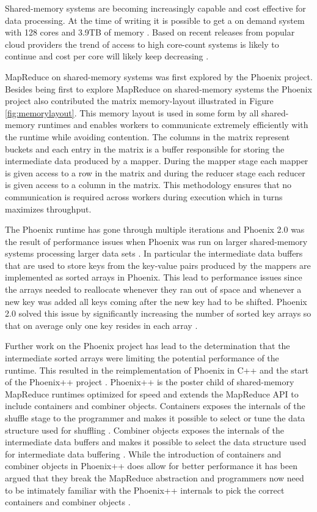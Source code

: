 \documentclass[twocolumn,11px]{article}       %
\begin{document}
Shared-memory systems are becoming increasingly capable and cost effective for
data processing. At the time of writing it is possible to get a on demand system
with 128 cores and 3.9TB of memory \cite{AWS}. Based on
recent releases from popular cloud providers the trend of access to high
core-count systems is likely to continue and cost per core will likely keep
decreasing \cite{AWS} \cite{GoogleCloud}.

MapReduce on shared-memory systems was first explored by the Phoenix
\cite{Phoenix} project. Besides being first to explore MapReduce on
shared-memory systems the Phoenix project also contributed the matrix
memory-layout illustrated in Figure \ref{fig:memorylayout}. This memory layout
is used in some form by all shared-memory runtimes \cite{Phoenix}
\cite{Phoenix++} \cite{CilkMR} \cite{Metis} \cite{Ostrich} and enables workers
to communicate extremely efficiently with the runtime while avoiding contention.
The columns in the matrix represent buckets and each entry in the matrix is a
buffer responsible for storing the intermediate data produced by a mapper.
During the mapper stage each mapper is given access to a row in the matrix and
during the reducer stage each reducer is given access to a column in the matrix.
This methodology ensures that no communication is required across workers during
execution which in turns maximizes throughput.

The Phoenix runtime has gone through multiple iterations and Phoenix 2.0 was the
result of performance issues when Phoenix was run on larger shared-memory
systems processing larger data sets \cite{Phoenix2}. In particular the
intermediate data buffers that are used to store keys from the key-value pairs
produced by the mappers are implemented as sorted arrays in Phoenix. This lead
to performance issues since the arrays needed to reallocate whenever they ran
out of space and whenever a new key was added all keys coming after the new key
had to be shifted. Phoenix 2.0 solved this issue by significantly increasing the
number of sorted key arrays so that on average only one key resides in each
array \cite{Phoenix2}.

Further work on the Phoenix project has lead to the determination that the
intermediate sorted arrays were limiting the potential performance of the
runtime. This resulted in the reimplementation of Phoenix in C++ and the start
of the Phoenix++ project \cite{Phoenix++}. Phoenix++ is the poster child of
shared-memory MapReduce runtimes optimized for speed and extends the MapReduce
API to include containers and combiner objects. Containers exposes the internals
of the shuffle stage to the programmer and makes it possible to select or tune
the data structure used for shuffling \cite{Phoenix++}. Combiner objects exposes
the internals of the intermediate data buffers and makes it possible to select
the data structure used for intermediate data buffering \cite{Phoenix++}. While
the introduction of containers and combiner objects in Phoenix++ does allow for
better performance it has been argued that they break the MapReduce abstraction
and programmers now need to be intimately familiar with the Phoenix++ internals
to pick the correct containers and combiner objects \cite{CilkMR}.
\end{document}
